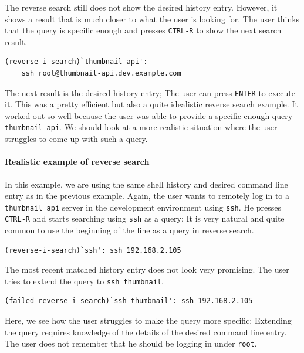 The reverse search still does not show the desired history entry. However, it shows a result that is much closer to what the user is looking for. The user thinks that the query is specific enough and presses \verb|CTRL-R| to show the next search result.

\begin{verbatim}
(reverse-i-search)`thumbnail-api':
    ssh root@thumbnail-api.dev.example.com
\end{verbatim}

The next result is the desired history entry; The user can press \verb|ENTER| to execute it. This was a pretty efficient but also a quite idealistic reverse search example. It worked out so well because the user was able to provide a specific enough query -- \verb|thumbnail-api|. We should look at a more realistic situation where the user struggles to come up with such a query. 

\paragraph{Realistic example of reverse search}

In this example, we are using the same shell history and desired command line entry as in the previous example. Again, the user wants to remotely log in to a \verb|thumbnail api| server in the development environment using \verb|ssh|. He presses \verb|CTRL-R| and starts searching using \verb|ssh| as a query; It is very natural and quite common to use the beginning of the line as a query in reverse search.

\begin{verbatim}
(reverse-i-search)`ssh': ssh 192.168.2.105
\end{verbatim}

The most recent matched history entry does not look very promising. The user tries to extend the query to \verb|ssh thumbnail|.

\begin{verbatim}
(failed reverse-i-search)`ssh thumbnail': ssh 192.168.2.105
\end{verbatim}

Here, we see how the user struggles to make the query more specific; Extending the query requires knowledge of the details of the desired command line entry. The user does not remember that he should be logging in under \verb|root|. %

